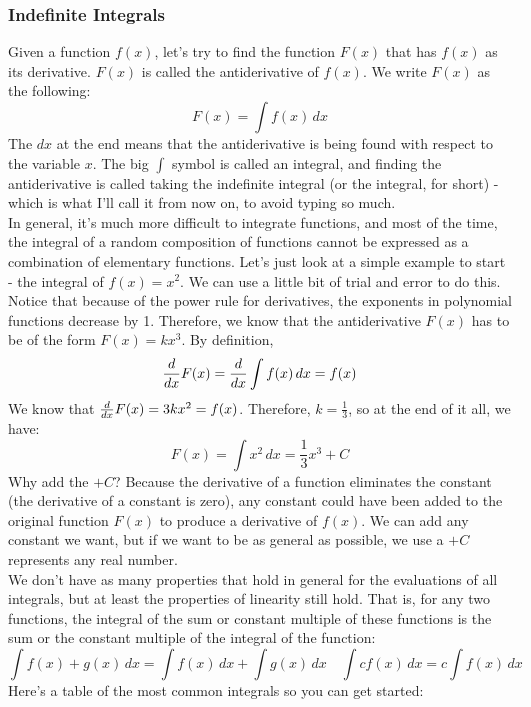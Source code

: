 \subsubsection{Indefinite Integrals}
Given a function $f(x)$, let's try to find the function $F(x)$ that has $f(x)$ as its derivative. $F(x)$ is called the antiderivative of $f(x)$. We write $F(x)$ as the following:
\[
	F(x) = \int f(x) \, dx 
\]
The $dx$ at the end means that the antiderivative is being found with respect to the variable $x$. The big $\int$ symbol is called an integral, and finding the antiderivative is called taking the indefinite integral (or the integral, for short) - which is what I'll call it from now on, to avoid typing so much. \\
In general, it's much more difficult to integrate functions, and most of the time, the integral of a random composition of functions cannot be expressed as a combination of elementary functions. Let's just look at a simple example to start - the integral of $f(x) = x^2$. We can use a little bit of trial and error to do this. Notice that because of the power rule for derivatives, the exponents in polynomial functions decrease by 1. Therefore, we know that the antiderivative $F(x)$ has to be of the form $F(x) = kx^3$. By definition, 
\[
	\frac{d }{d x} F(x) = \frac{d }{d x} \int f(x) \, dx = f(x) 
\]
We know that $\frac{d }{d x} F(x) = 3 kx^2 = f(x)$. Therefore, $k = \frac{1}{3}$, so at the end of it all, we have:
\[
	F(x) = \int x^2 \, dx  = \frac{1}{3}x^3 + C
\]
Why add the $+C$? Because the derivative of a function eliminates the constant (the derivative of a constant is zero), any constant could have been added to the original function $F(x)$ to produce a derivative of $f(x)$. We can add any constant we want, but if we want to be as general as possible, we use a $+C$ represents any real number.\\
We don't have as many properties that hold in general for the evaluations of all integrals, but at least the properties of linearity still hold. That is, for any two functions, the integral of the sum or constant multiple of these functions is the sum or the constant multiple of the integral of the function:
\[
	\int f(x) + g(x) \, dx = \int f(x) \, dx + \int g(x) \, dx \quad \int cf(x) \, dx = c \int f(x) \, dx
\]
Here's a table of the most common integrals so you can get started: 
